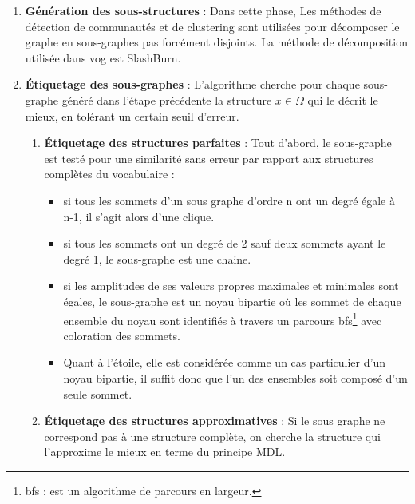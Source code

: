 \begin{enumerate}
 \item \textbf{Génération des sous-structures }: Dans cette phase, Les méthodes de détection de communautés et de clustering sont utilisées pour décomposer le graphe en sous-graphes pas forcément disjoints. La méthode de décomposition utilisée dans \gls{vog} est SlashBurn.  
 \item \textbf{Étiquetage des sous-graphes }: L'algorithme cherche pour chaque sous-graphe généré dans l'étape précédente la structure $x \in \Omega$ qui le décrit le mieux, en tolérant un certain seuil d'erreur.
  \begin{enumerate}[label=\alph*]
     \item \textbf{Étiquetage des structures parfaites} : Tout d'abord, le sous-graphe est testé pour une similarité sans erreur par rapport aux structures complètes du vocabulaire :
\begin{itemize}[label=$\circ$]
	\item si tous les sommets d'un sous graphe d'ordre n ont un degré égale à n-1, il s'agit alors d'une clique.
	\item si tous les sommets ont un degré de 2 sauf deux sommets ayant le degré 1, le  sous-graphe est une chaine.
	\item si les amplitudes de ses valeurs propres maximales et minimales sont égales, le sous-graphe est un noyau bipartie où les sommet de chaque ensemble du noyau sont identifiés à travers un parcours 
	\gls{bfs}\footnote{\gls{bfs} : est un algorithme de parcours en largeur.}	
	 avec coloration des sommets.
	\item  Quant à l'étoile, elle est considérée comme un cas particulier d'un noyau bipartie, il suffit donc que l'un des ensembles soit composé d'un seule sommet.
\end{itemize}     
     \item \textbf{Étiquetage des structures approximatives }: Si le sous graphe ne correspond pas à une structure complète, on cherche la structure qui l'approxime le mieux en terme du principe MDL.
     

\end{enumerate}
\end{enumerate}
